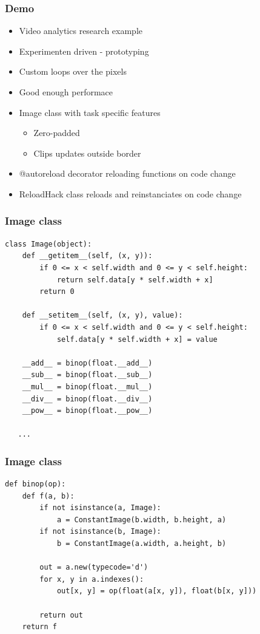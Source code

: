 \documentclass[utf8x]{beamer}
\begin{document}
\begin{frame}
  \frametitle{Demo}
  \vfill
  \begin{itemize}
      \item Video analytics research example
      \item Experimenten driven - prototyping
      \item Custom loops over the pixels
      \item Good enough performace
  \end{itemize}
  \vfill
  \begin{itemize}
      \item Image class with task specific features
        \begin{itemize}
            \item Zero-padded
            \item Clips updates outside border
        \end{itemize}
      \item @autoreload decorator reloading functions on code change
      \item ReloadHack class reloads and reinstanciates on code change
  \end{itemize}
  \vfill
\end{frame}

\begin{frame}[fragile]
  \frametitle{Image class}
\begin{lstlisting}[mathescape,basicstyle=\setstretch{1.05}\ttfamily\scriptsize]
class Image(object):
    def __getitem__(self, (x, y)):
        if 0 <= x < self.width and 0 <= y < self.height:
            return self.data[y * self.width + x]
        return 0

    def __setitem__(self, (x, y), value):
        if 0 <= x < self.width and 0 <= y < self.height:
            self.data[y * self.width + x] = value

    __add__ = binop(float.__add__)
    __sub__ = binop(float.__sub__)
    __mul__ = binop(float.__mul__)
    __div__ = binop(float.__div__)
    __pow__ = binop(float.__pow__)

   ...
\end{lstlisting}
\end{frame}

\begin{frame}[fragile]
  \frametitle{Image class}
\begin{lstlisting}[mathescape,basicstyle=\setstretch{1.05}\ttfamily\scriptsize]
def binop(op):
    def f(a, b):
        if not isinstance(a, Image):
            a = ConstantImage(b.width, b.height, a)
        if not isinstance(b, Image):
            b = ConstantImage(a.width, a.height, b)

        out = a.new(typecode='d')
        for x, y in a.indexes():
            out[x, y] = op(float(a[x, y]), float(b[x, y]))

        return out
    return f
\end{lstlisting}
\end{frame}
\end{document}
